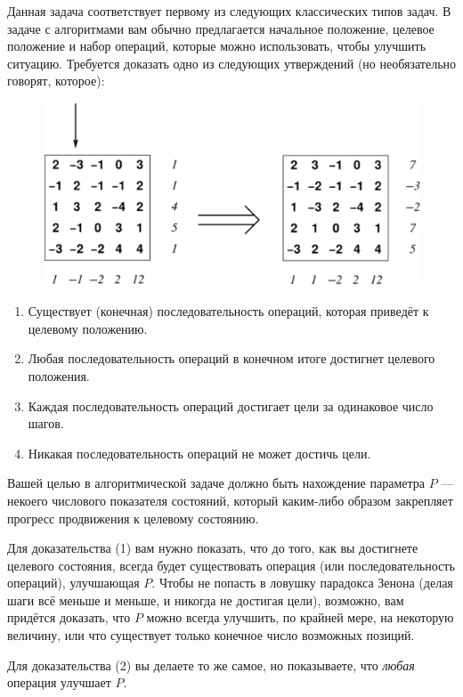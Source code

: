 Данная задача соответствует первому из следующих классических типов задач.
В задаче с алгоритмами вам обычно предлагается начальное положение, целевое положение и набор операций, которые можно использовать, чтобы улучшить ситуацию.
Требуется доказать одно из следующих утверждений (но необязательно говорят, которое):
\begin{figure}
\centering
\includegraphics[scale=0.6]{Figs/Algorithms/array}
\end{figure}
\begin{enumerate}[(1)]
\item Существует (конечная) последовательность операций, которая приведёт к целевому положению.
\item Любая последовательность операций в конечном итоге достигнет целевого положения.
\item Каждая последовательность операций достигает цели за одинаковое число шагов.
\item Никакая последовательность операций не может достичь цели.
\end{enumerate}

Вашей целью в алгоритмической задаче должно быть нахождение параметра $P$ --- некоего числового показателя состояний, который каким-либо образом закрепляет прогресс продвижения к целевому состоянию.

Для доказательства (1) вам нужно показать, что до того, как вы достигнете целевого состояния, всегда будет существовать операция (или последовательность операций), улучшающая $P$.
Чтобы не попасть в ловушку парадокса Зенона (делая шаги всё меньше и меньше, и никогда не достигая цели), возможно, вам придётся доказать, что $P$ можно всегда улучшить, по крайней мере, на некоторую величину, или что существует только конечное число возможных позиций.

Для доказательства (2) вы делаете то же самое, но показываете, что \emph{любая} операция улучшает $P$.

